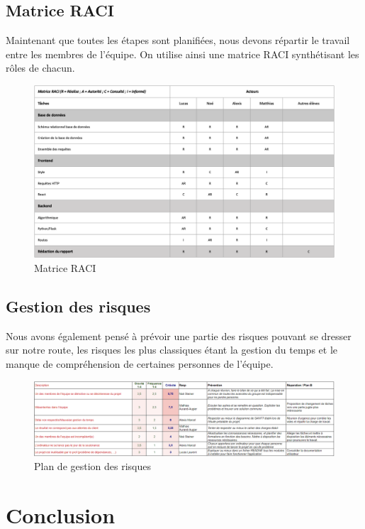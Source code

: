 \documentclass[french,a4paper]{article}
\begin{document}
\subsection{Matrice RACI}
Maintenant que toutes les étapes sont planifiées, nous devons répartir le travail entre les membres de l’équipe. On utilise ainsi une matrice RACI synthétisant les rôles de chacun.

\begin{figure}[H]
    \centering
    \includegraphics[width=1\textwidth]{img/RACI.png}
    \caption{Matrice RACI}
\end{figure}

\subsection{Gestion des risques}
Nous avons également pensé à prévoir une partie des risques pouvant se dresser sur notre route, les risques les plus classiques étant
la gestion du temps et le manque de compréhension de certaines personnes de l'équipe.
\begin{figure}[H]
    \centering
    \includegraphics[width=1\textwidth]{img/Plan_gestion_risque.png}
    \caption{Plan de gestion des risques}
\end{figure}

\section{Conclusion}
\end{document}
